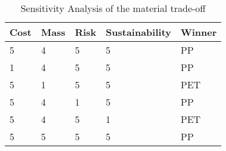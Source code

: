 \begin{table}[h]
\centering
\caption{Sensitivity Analysis of the material trade-off}
\label{tab:senstradeoff}
\begin{scriptsize}
\begin{tabular}{|p{1.5cm}|p{1.5cm}|p{1.5cm}|p{1.5cm}|p{1.5cm}|}
\hline
\textbf{Cost} & \textbf{Mass} & \textbf{Risk} & \textbf{Sustainability} & \textbf{Winner} \\ \hline
5    & 4    & 5    & 5              & PP     \\ \hline
\cellcolor[HTML]{F8CBAD}1    & 4    & 5    & 5              & PP     \\ \hline
5    &\cellcolor[HTML]{F8CBAD} 1    & 5    & 5              & PET    \\ \hline
5    & 4    &\cellcolor[HTML]{F8CBAD} 1    & 5              & PP     \\ \hline
5    & 4    & 5    &\cellcolor[HTML]{F8CBAD} 1              & PET    \\ \hline
5    & \cellcolor[HTML]{F8CBAD}5    & 5    & 5              & PP     \\ \hline

\end{tabular}%

\end{scriptsize}
\end{table}




